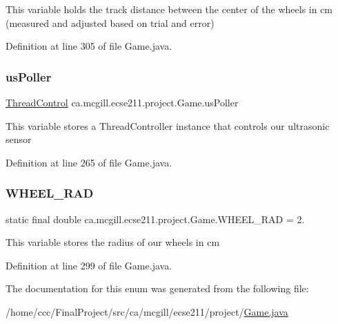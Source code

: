 This variable holds the track distance between the center of the wheels in cm (measured and adjusted based on trial and error) 

Definition at line 305 of file Game.\+java.

\mbox{\label{enumca_1_1mcgill_1_1ecse211_1_1project_1_1_game_af6fee74efff891793b32352caa110465}} 
\subsubsection{\texorpdfstring{us\+Poller}{usPoller}}
{\footnotesize\ttfamily \hyperlink{classca_1_1mcgill_1_1ecse211_1_1threads_1_1_thread_control}{Thread\+Control} ca.\+mcgill.\+ecse211.\+project.\+Game.\+us\+Poller}

This variable stores a Thread\+Controller instance that controls our ultrasonic sensor 

Definition at line 265 of file Game.\+java.

\mbox{\label{enumca_1_1mcgill_1_1ecse211_1_1project_1_1_game_a91bd64670c2a91d006c907142783b1f8}} 
\subsubsection{\texorpdfstring{W\+H\+E\+E\+L\+\_\+\+R\+AD}{WHEEL\_RAD}}
{\footnotesize\ttfamily  static  final double ca.\+mcgill.\+ecse211.\+project.\+Game.\+W\+H\+E\+E\+L\+\_\+\+R\+AD = 2.\hspace{0.3cm}{\ttfamily [static]}}

This variable stores the radius of our wheels in cm 

Definition at line 299 of file Game.\+java.



The documentation for this enum was generated from the following file\+:\begin{DoxyCompactItemize}
\item 
/home/ccc/\+Final\+Project/src/ca/mcgill/ecse211/project/\hyperlink{_game_8java}{Game.\+java}\end{DoxyCompactItemize}
